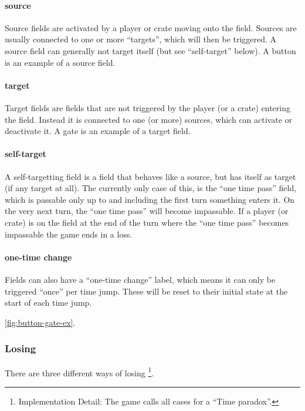 \paragraph{source}  Source fields are activated by a player or crate
moving onto the field.  Sources are usually connected to one or more
``targets'', which will then be triggered.  A source field can
generally not target itself (but see ``self-target'' below).  A button
is an example of a source field.

\paragraph{target}  Target fields are fields that are not triggered
by the player (or a crate) entering the field.  Instead it is
connected to one (or more) sources, which can activate or deactivate
it.  A gate is an example of a target field.

\paragraph{self-target}  A self-targetting field is a field that behaves
like a source, but has itself as target (if any target at all).  The
currently only case of this, is the ``one time pass'' field, which is
passable only up to and including the first turn something enters it.
On the very next turn, the ``one time pass'' will become impassable.
If a player (or crate) is on the field at the end of the turn where
the ``one time pass'' becomes impassable the game ends in a loss.

\paragraph{one-time change}  Fields can also have a ``one-time change''
label, which means it can only be triggered ``once'' per time jump.
These will be reset to their initial state at the start of each time
jump.

\ref{fig:button-gate-ex}.


\subsubsection{Losing}

There are three different ways of losing
\footnote{Implementation Detail: The game calls all cases for a ``Time paradox''.}.


